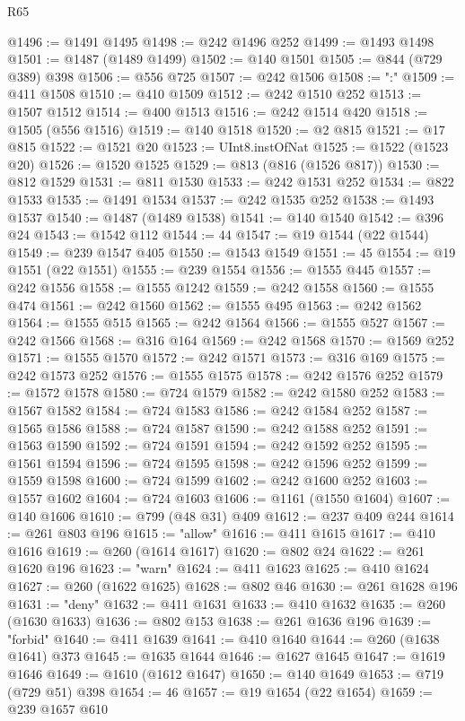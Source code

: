 \begin{lexlean}{R65}
\begin{coremodule}
@1496 := @1491 @1495
@1498 := @242 @1496 @252
@1499 := @1493 @1498
@1501 := @1487 (@1489 @1499)
@1502 := @140 @1501
@1505 := @844 (@729 @389) @398
@1506 := @556 @725
@1507 := @242 @1506
@1508 := ":"
@1509 := @411 @1508
@1510 := @410 @1509
@1512 := @242 @1510 @252
@1513 := @1507 @1512
@1514 := @400 @1513
@1516 := @242 @1514 @420
@1518 := @1505 (@556 @1516)
@1519 := @140 @1518
@1520 := @2 @815
@1521 := @17 @815
@1522 := @1521 @20
@1523 := UInt8.instOfNat
@1525 := @1522 (@1523 @20)
@1526 := @1520 @1525
@1529 := @813 (@816 (@1526 @817))
@1530 := @812 @1529
@1531 := @811 @1530
@1533 := @242 @1531 @252
@1534 := @822 @1533
@1535 := @1491 @1534
@1537 := @242 @1535 @252
@1538 := @1493 @1537
@1540 := @1487 (@1489 @1538)
@1541 := @140 @1540
@1542 := @396 @24
@1543 := @1542 @112
@1544 := 44
@1547 := @19 @1544 (@22 @1544)
@1549 := @239 @1547 @405
@1550 := @1543 @1549
@1551 := 45
@1554 := @19 @1551 (@22 @1551)
@1555 := @239 @1554
@1556 := @1555 @445
@1557 := @242 @1556
@1558 := @1555 @1242
@1559 := @242 @1558
@1560 := @1555 @474
@1561 := @242 @1560
@1562 := @1555 @495
@1563 := @242 @1562
@1564 := @1555 @515
@1565 := @242 @1564
@1566 := @1555 @527
@1567 := @242 @1566
@1568 := @316 @164
@1569 := @242 @1568
@1570 := @1569 @252
@1571 := @1555 @1570
@1572 := @242 @1571
@1573 := @316 @169
@1575 := @242 @1573 @252
@1576 := @1555 @1575
@1578 := @242 @1576 @252
@1579 := @1572 @1578
@1580 := @724 @1579
@1582 := @242 @1580 @252
@1583 := @1567 @1582
@1584 := @724 @1583
@1586 := @242 @1584 @252
@1587 := @1565 @1586
@1588 := @724 @1587
@1590 := @242 @1588 @252
@1591 := @1563 @1590
@1592 := @724 @1591
@1594 := @242 @1592 @252
@1595 := @1561 @1594
@1596 := @724 @1595
@1598 := @242 @1596 @252
@1599 := @1559 @1598
@1600 := @724 @1599
@1602 := @242 @1600 @252
@1603 := @1557 @1602
@1604 := @724 @1603
@1606 := @1161 (@1550 @1604)
@1607 := @140 @1606
@1610 := @799 (@48 @31) @409
@1612 := @237 @409 @244
@1614 := @261 @803 @196
@1615 := "allow"
@1616 := @411 @1615
@1617 := @410 @1616
@1619 := @260 (@1614 @1617)
@1620 := @802 @24
@1622 := @261 @1620 @196
@1623 := "warn"
@1624 := @411 @1623
@1625 := @410 @1624
@1627 := @260 (@1622 @1625)
@1628 := @802 @46
@1630 := @261 @1628 @196
@1631 := "deny"
@1632 := @411 @1631
@1633 := @410 @1632
@1635 := @260 (@1630 @1633)
@1636 := @802 @153
@1638 := @261 @1636 @196
@1639 := "forbid"
@1640 := @411 @1639
@1641 := @410 @1640
@1644 := @260 (@1638 @1641) @373
@1645 := @1635 @1644
@1646 := @1627 @1645
@1647 := @1619 @1646
@1649 := @1610 (@1612 @1647)
@1650 := @140 @1649
@1653 := @719 (@729 @51) @398
@1654 := 46
@1657 := @19 @1654 (@22 @1654)
@1659 := @239 @1657 @610

\end{coremodule}
\end{lexlean}
